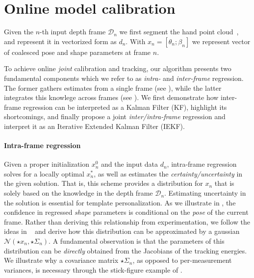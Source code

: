 
\section{Online model calibration}
\label{sec:technical}
Given the $n$-th input depth frame $\mathcal{D}_n$ we first segment the hand point cloud~\cite{htrack}, and represent it in vectorized form as $d_n$. With $x_n = [\theta_n; \beta_n]$ we represent vector of coalesced pose and shape parameters at frame $n$. 

To achieve online \emph{joint} calibration and tracking, our algorithm presents two fundamental components which we refer to as \emph{intra-} and \emph{inter-frame} regression. The former gathers estimates from a single frame (see ), while the latter integrates this knowlege across frames (see ). We first demonstrate how inter-frame regression can be interpreted as a Kalman Filter (KF), highlight its shortcomings, and finally propose a joint \emph{inter/intra-frame} regression and interpret it as an Iterative Extended Kalman Filter (IEKF).


\paragraph{Intra-frame regression}
Given a proper initialization $x_n^0$ and the input data $d_n$, intra-frame regression solves for a locally optimal $x_n^*$, as well as estimates the \emph{certainty/uncertainty} in the given solution. That is, this scheme provides a distribution for $x_n$ that is solely based on the knowledge in the depth frame $\mathcal{D}_n$. Estimating uncertainty in the solution is essential for template personalization. As we illustrate in , the confidence in regressed \emph{shape} parameters is conditional on the \emph{pose} of the current frame.
Rather than deriving this relationship from experimentation, we follow the ideas in ~ and derive how this distribution can be approximated by a gaussian $\mathcal{N}(\star{x}_n, \star{\Sigma}_n)$.
A fundamental observation is that the parameters of this distribution can be \emph{directly} obtained from the Jacobians of the tracking energies. We illustrate why a covariance matrix $\star{\Sigma}_n$, as opposed to per-measurement variances, is necessary through the stick-figure example of .


